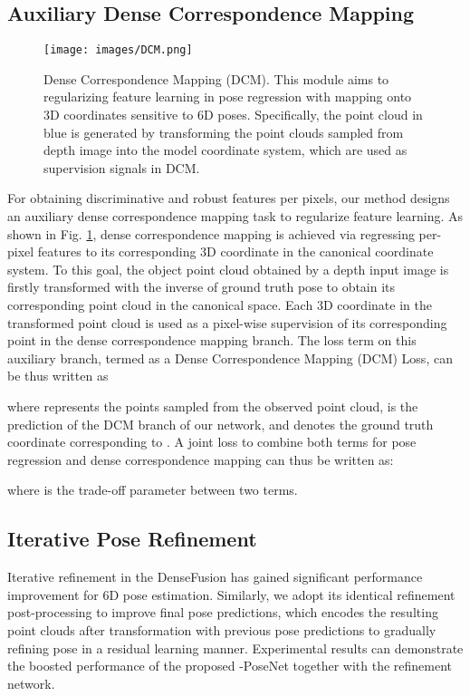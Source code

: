 \documentclass[letterpaper, 10 pt, conference]{ieeeconf}
\begin{document}
\subsection{Auxiliary Dense Correspondence Mapping}\label{subsec:dcm}
\begin{figure}[t]
\centering
\texttt{[image: images/DCM.png]}
\caption{Dense Correspondence Mapping (DCM). This module aims to regularizing feature learning in pose regression with mapping onto 3D coordinates sensitive to 6D poses. Specifically, the point cloud in blue is generated by transforming the point clouds sampled from depth image into the model coordinate system, which are used as supervision signals in DCM.}
\label{fig:DCM}\vspace{-0.5cm}
\end{figure}

For obtaining discriminative and robust features per pixels, our method designs an auxiliary dense correspondence mapping task to regularize feature learning.
As shown in Fig. \ref{fig:DCM}, dense correspondence mapping is achieved via regressing per-pixel features  to its corresponding 3D coordinate in the canonical coordinate system.
To this goal, the object point cloud obtained by a depth input image is firstly transformed with the inverse of ground truth pose  to obtain its corresponding point cloud in the canonical space.
Each 3D coordinate in the transformed point cloud is used as a pixel-wise supervision of its corresponding point in the dense correspondence mapping branch.
The loss term on this auxiliary branch, termed as a Dense Correspondence Mapping (DCM) Loss, can be thus written as  

where  represents the points sampled from the observed point cloud,  is the prediction of the DCM branch of our network, and  denotes the ground truth coordinate corresponding to . A joint loss  to combine both terms for pose regression and dense correspondence mapping can thus be written as:

where  is the trade-off parameter between two terms.

\subsection{Iterative Pose Refinement}\label{subsec.ipr}

Iterative refinement in the DenseFusion \cite{wang2019densefusion} has gained significant performance improvement for 6D pose estimation.
Similarly, we adopt its identical refinement post-processing to improve final pose predictions, which encodes the resulting point clouds after transformation with previous pose predictions to gradually refining pose in a residual learning manner. 
Experimental results can demonstrate the boosted performance of the proposed -PoseNet together with the refinement network.
\end{document}
